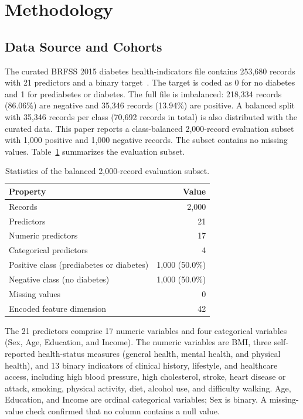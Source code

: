 \documentclass[conference]{IEEEtran}
\begin{document}
\section{Methodology}
\label{sec:method}

\subsection{Data Source and Cohorts}

The curated BRFSS 2015 diabetes health-indicators file contains 253,680 records with 21 predictors and a binary target~\cite{kaggle2021diabetes}. The target is coded as 0 for no diabetes and 1 for prediabetes or diabetes. The full file is imbalanced: 218,334 records (86.06\%) are negative and 35,346 records (13.94\%) are positive. A balanced split with 35,346 records per class (70,692 records in total) is also distributed with the curated data. This paper reports a class-balanced 2,000-record evaluation subset with 1,000 positive and 1,000 negative records. The subset contains no missing values. Table~\ref{tab:dataset} summarizes the evaluation subset.

\begin{table}[!t]
\renewcommand{\arraystretch}{1.15}
\caption{Statistics of the balanced 2,000-record evaluation subset.}
\label{tab:dataset}
\centering
\footnotesize
\begin{tabular}{@{}lr@{}}
\hline
Property & Value \\
\hline
Records & 2,000 \\
Predictors & 21 \\
Numeric predictors & 17 \\
Categorical predictors & 4 \\
Positive class (prediabetes or diabetes) & 1,000 (50.0\%) \\
Negative class (no diabetes) & 1,000 (50.0\%) \\
Missing values & 0 \\
Encoded feature dimension & 42 \\
\hline
\end{tabular}
\end{table}

The 21 predictors comprise 17 numeric variables and four categorical variables (Sex, Age, Education, and Income). The numeric variables are BMI, three self-reported health-status measures (general health, mental health, and physical health), and 13 binary indicators of clinical history, lifestyle, and healthcare access, including high blood pressure, high cholesterol, stroke, heart disease or attack, smoking, physical activity, diet, alcohol use, and difficulty walking. Age, Education, and Income are ordinal categorical variables; Sex is binary. A missing-value check confirmed that no column contains a null value.
\end{document}
